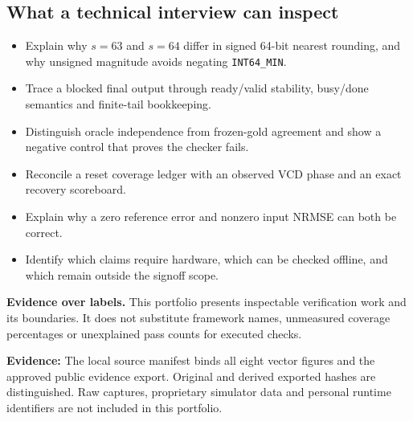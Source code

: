 \documentclass[11pt,letterpaper]{article}
\newcommand{\evidence}[1]{\par{\footnotesize\raggedright\sloppy\color{muted}\textbf{Evidence:} #1\par}}
\newcommand{\callout}[2]{\par\medskip\noindent\textbf{#1.} #2\par\smallskip}
\begin{document}
\subsection{What a technical interview can inspect}
\begin{itemize}
\item Explain why $s=63$ and $s=64$ differ in signed 64-bit nearest rounding, and why unsigned magnitude avoids negating \texttt{INT64\_MIN}.
\item Trace a blocked final output through ready/valid stability, busy/done semantics and finite-tail bookkeeping.
\item Distinguish oracle independence from frozen-gold agreement and show a negative control that proves the checker fails.
\item Reconcile a reset coverage ledger with an observed VCD phase and an exact recovery scoreboard.
\item Explain why a zero reference error and nonzero input NRMSE can both be correct.
\item Identify which claims require hardware, which can be checked offline, and which remain outside the signoff scope.
\end{itemize}
\callout{Evidence over labels}{This portfolio presents inspectable verification work and its boundaries. It does not substitute framework names, unmeasured coverage percentages or unexplained pass counts for executed checks.}
\evidence{The local source manifest binds all eight vector figures and the approved public evidence export. Original and derived exported hashes are distinguished. Raw captures, proprietary simulator data and personal runtime identifiers are not included in this portfolio.}
\end{document}
